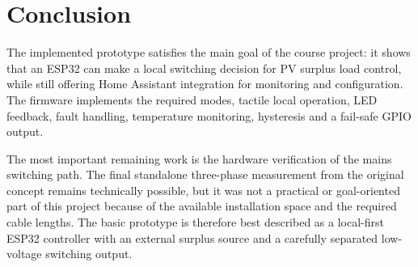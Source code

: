 \documentclass[12pt,a4paper]{article}
\begin{document}
\newpage
\section{Conclusion}

The implemented prototype satisfies the main goal of the course project: it shows
that an ESP32 can make a local switching decision for PV surplus load control,
while still offering Home Assistant integration for monitoring and configuration.
The firmware implements the required modes, tactile local operation, LED feedback,
fault handling, temperature monitoring, hysteresis and a fail-safe GPIO output.

The most important remaining work is the hardware verification of the mains
switching path. The final standalone three-phase measurement from the original
concept remains technically possible, but it was not a practical or
goal-oriented part of this project because of the available installation space and
the required cable lengths. The basic prototype is therefore best described as a
local-first ESP32 controller with an external surplus source and a carefully
separated low-voltage switching output.
\end{document}
